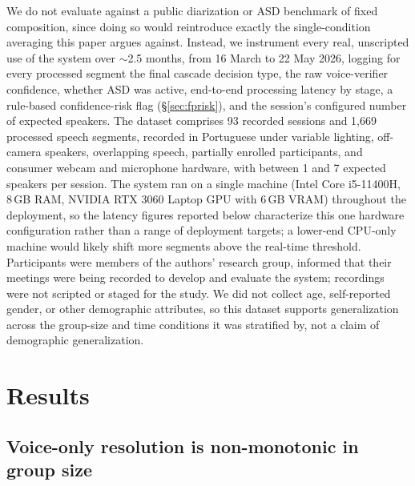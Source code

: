 \documentclass[conference,a4paper]{IEEEtran}
\begin{document}
We do not evaluate against a public diarization or ASD benchmark of
fixed composition, since doing so would reintroduce exactly the
single-condition averaging this paper argues against. Instead, we
instrument every real, unscripted use of the system over $\sim$2.5
months, from 16 March to 22 May 2026, logging for every processed
segment the final cascade decision type, the raw voice-verifier
confidence, whether ASD was active, end-to-end processing latency by
stage, a rule-based confidence-risk flag (\S\ref{sec:fprisk}), and the
session's configured number of expected speakers. The dataset comprises
93 recorded sessions and 1{,}669 processed speech segments, recorded in
Portuguese under variable lighting, off-camera speakers, overlapping
speech, partially enrolled participants, and consumer webcam and
microphone hardware, with between 1 and 7 expected speakers per
session. The system ran on a single machine (Intel Core i5-11400H,
8\,GB RAM, NVIDIA RTX 3060 Laptop GPU with 6\,GB VRAM) throughout the
deployment, so the latency figures reported below characterize this
one hardware configuration rather than a range of deployment targets;
a lower-end CPU-only machine would likely shift more segments above
the real-time threshold. Participants were members of the authors'
research group, informed that their meetings were being recorded to
develop and evaluate the system; recordings were not scripted or
staged for the study. We did not collect age, self-reported gender, or
other demographic attributes, so this dataset supports generalization
across the group-size and time conditions it was stratified by, not a
claim of demographic generalization.

\section{Results}

\subsection{Voice-only resolution is non-monotonic in group size}
\label{sec:bysize}
\end{document}
